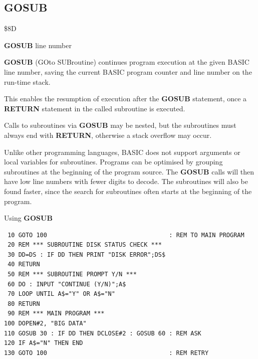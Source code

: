 \subsection{GOSUB}
\begin{description}[leftmargin=2cm,style=nextline]
\item [Token:]    \$8D

\item [Format:]   {\bf GOSUB} line number

\item [Usage:]    {\bf GOSUB} (GOto SUBroutine) continues program execution at the given BASIC line number, saving the current BASIC program counter and line number on the run-time stack.
               
                  This enables the resumption of execution after the {\bf GOSUB} statement, once a {\bf RETURN} statement in the called subroutine is executed.
                  
                  Calls to subroutines via {\bf GOSUB} may be nested, but the subroutines must always end with {\bf RETURN}, otherwise a stack overflow may occur.

\item [Remarks:]  Unlike other programming languages, BASIC does not support arguments or local variables for subroutines. Programs can be optimised by grouping subroutines at the beginning of the program source. The {\bf GOSUB} calls will then have low line numbers with fewer digits to decode. The subroutines will also be found faster, since the search for subroutines often starts at the beginning of the program.

\item [Example:]  Using {\bf GOSUB}

\begin{tcolorbox}[colback=black,coltext=white]
\verbatimfont{\codefont}
\begin{verbatim}
 10 GOTO 100                                  : REM TO MAIN PROGRAM
 20 REM *** SUBROUTINE DISK STATUS CHECK ***
 30 DD=DS : IF DD THEN PRINT "DISK ERROR";DS$
 40 RETURN
 50 REM *** SUBROUTINE PROMPT Y/N ***
 60 DO : INPUT "CONTINUE (Y/N)";A$
 70 LOOP UNTIL A$="Y" OR A$="N"
 80 RETURN
 90 REM *** MAIN PROGRAM ***
100 DOPEN#2, "BIG DATA"
110 GOSUB 30 : IF DD THEN DCLOSE#2 : GOSUB 60 : REM ASK
120 IF A$="N" THEN END
130 GOTO 100                                  : REM RETRY
\end{verbatim}
\end{tcolorbox}
\end{description}

